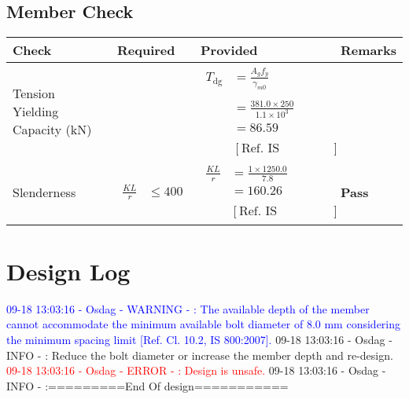 \documentclass{article}%
\begin{document}
%
%
\subsection{Member Check}%
\label{subsec:MemberCheck}%
\renewcommand{\arraystretch}{1.2}%
\begin{longtable}{|p{2.5cm}|p{4.5cm}|p{7cm}|p{1.5cm}|}%
\hline%
\rowcolor{OsdagGreen}%
Check&Required&Provided&Remarks\\%
\hline%
\endhead%
\hline%
Tension Yielding Capacity (kN)&&$\begin{aligned} T_{\text{dg}} &= \frac{A_g f_y}{\gamma_{m0}}\\ \\ &=\frac{381.0\times250}{1.1\times 10^3}\\ &=86.59\\ \\ & [\text{Ref. IS 800:2007, Cl.6.2}] \end{aligned}$&\textcolor{OsdagGreen}{ 
\textbf{}
}\\%
\hline%
Slenderness&$\begin{aligned}\frac{K L}{r} &\leq 400\end{aligned}$&$\begin{aligned}\frac{K L}{r} &= \frac{1\times1250.0}{7.8}\\ &= 160.26\\ \\ & [\text{Ref. IS 800:2007, Cl.7.1.2}] \end{aligned}$&\textcolor{OsdagGreen}{ 
\textbf{Pass}
}\\%
\hline%
\end{longtable}

%
\section{Design Log}%
\label{sec:DesignLog}%
%
\textcolor{blue}{ 
09{-}18 13:03:16 {-} Osdag {-} WARNING {-} : The available depth of the member cannot accommodate the minimum available bolt diameter of 8.0 mm considering the minimum spacing limit {[}Ref. Cl. 10.2, IS 800:2007{]}.
}%
\textcolor{OsdagGreen}{ 
09{-}18 13:03:16 {-} Osdag {-} INFO {-} : Reduce the bolt diameter or increase the member depth and re{-}design.
}%
\textcolor{red}{ 
09{-}18 13:03:16 {-} Osdag {-} ERROR {-} : Design is unsafe. 
}%
\textcolor{OsdagGreen}{ 
09{-}18 13:03:16 {-} Osdag {-} INFO {-} :=========End Of design===========
}

%
\end{document}
